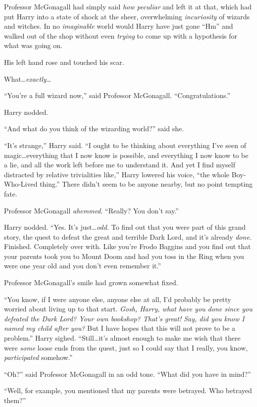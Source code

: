 Professor McGonagall had simply said \emph{how peculiar} and left it at that, which had put Harry into a state of shock at the sheer, overwhelming \emph{incuriosity} of wizards and witches. In no \emph{imaginable} world would Harry have just gone “Hm” and walked out of the shop without even \emph{trying} to come up with a hypothesis for what was going on.

His left hand rose and touched his scar.

What…\emph{exactly…}

“You’re a full wizard now,” said Professor McGonagall. “Congratulations.”

Harry nodded.

“And what do you think of the wizarding world?” said she.

“It’s strange,” Harry said. “I ought to be thinking about everything I’ve seen of magic…everything that I now know is possible, and everything I now know to be a lie, and all the work left before me to understand it. And yet I find myself distracted by relative trivialities like,” Harry lowered his voice, “the whole Boy-Who-Lived thing.” There didn’t seem to be anyone nearby, but no point tempting fate.

Professor McGonagall \emph{ahemmed}. “Really? You don’t say.”

Harry nodded. “Yes. It’s just…\emph{odd.} To find out that you were part of this grand story, the quest to defeat the great and terrible Dark Lord, and it’s already \emph{done.} Finished. Completely over with. Like you’re Frodo Baggins and you find out that your parents took you to Mount Doom and had you toss in the Ring when you were one year old and you don’t even remember it.”

Professor McGonagall’s smile had grown somewhat fixed.

“You know, if I were anyone else, anyone else at all, I’d probably be pretty worried about living up to that start. \emph{Gosh, Harry, what have you done since you defeated the Dark Lord? Your own bookshop? That’s great! Say, did you know I named my child after you?} But I have hopes that this will not prove to be a problem.” Harry sighed. “Still…it’s almost enough to make me wish that there were \emph{some} loose ends from the quest, just so I could say that I really, you know, \emph{participated} somehow.”

“Oh?” said Professor McGonagall in an odd tone. “What did you have in mind?”

“Well, for example, you mentioned that my parents were betrayed. Who betrayed them?”

